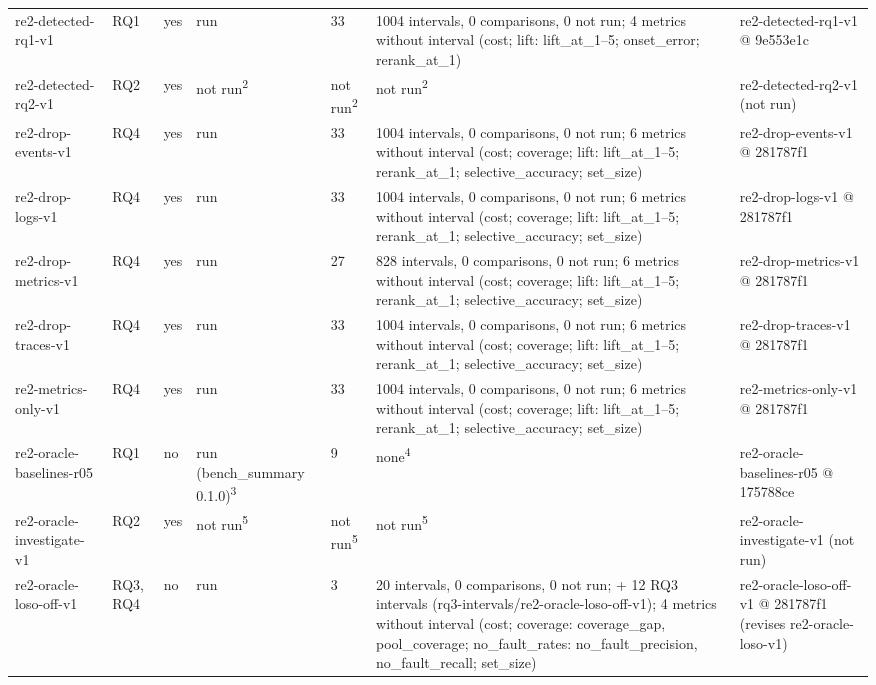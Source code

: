 \begin{table}[t]
\begin{tabular}{lllllll}
re2-detected-rq1-v1 & RQ1 & yes & run & 33 & 1004 intervals, 0 comparisons, 0 not run; 4 metrics without interval (cost; lift: lift\_at\_1--5; onset\_error; rerank\_at\_1) & re2-detected-rq1-v1 @ 9e553e1c \\
re2-detected-rq2-v1 & RQ2 & yes & not run\textsuperscript{2} & not run\textsuperscript{2} & not run\textsuperscript{2} & re2-detected-rq2-v1 (not run) \\
re2-drop-events-v1 & RQ4 & yes & run & 33 & 1004 intervals, 0 comparisons, 0 not run; 6 metrics without interval (cost; coverage; lift: lift\_at\_1--5; rerank\_at\_1; selective\_accuracy; set\_size) & re2-drop-events-v1 @ 281787f1 \\
re2-drop-logs-v1 & RQ4 & yes & run & 33 & 1004 intervals, 0 comparisons, 0 not run; 6 metrics without interval (cost; coverage; lift: lift\_at\_1--5; rerank\_at\_1; selective\_accuracy; set\_size) & re2-drop-logs-v1 @ 281787f1 \\
re2-drop-metrics-v1 & RQ4 & yes & run & 27 & 828 intervals, 0 comparisons, 0 not run; 6 metrics without interval (cost; coverage; lift: lift\_at\_1--5; rerank\_at\_1; selective\_accuracy; set\_size) & re2-drop-metrics-v1 @ 281787f1 \\
re2-drop-traces-v1 & RQ4 & yes & run & 33 & 1004 intervals, 0 comparisons, 0 not run; 6 metrics without interval (cost; coverage; lift: lift\_at\_1--5; rerank\_at\_1; selective\_accuracy; set\_size) & re2-drop-traces-v1 @ 281787f1 \\
re2-metrics-only-v1 & RQ4 & yes & run & 33 & 1004 intervals, 0 comparisons, 0 not run; 6 metrics without interval (cost; coverage; lift: lift\_at\_1--5; rerank\_at\_1; selective\_accuracy; set\_size) & re2-metrics-only-v1 @ 281787f1 \\
re2-oracle-baselines-r05 & RQ1 & no & run (bench\_summary 0.1.0)\textsuperscript{3} & 9 & none\textsuperscript{4} & re2-oracle-baselines-r05 @ 175788ce \\
re2-oracle-investigate-v1 & RQ2 & yes & not run\textsuperscript{5} & not run\textsuperscript{5} & not run\textsuperscript{5} & re2-oracle-investigate-v1 (not run) \\
re2-oracle-loso-off-v1 & RQ3, RQ4 & no & run & 3 & 20 intervals, 0 comparisons, 0 not run; + 12 RQ3 intervals (rq3-intervals/re2-oracle-loso-off-v1); 4 metrics without interval (cost; coverage: coverage\_gap, pool\_coverage; no\_fault\_rates: no\_fault\_precision, no\_fault\_recall; set\_size) & re2-oracle-loso-off-v1 @ 281787f1 (revises re2-oracle-loso-v1) \\

\end{tabular}
\end{table}
